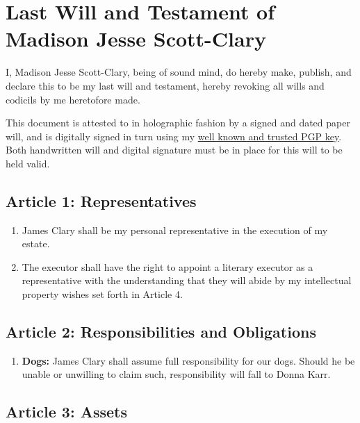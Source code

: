 \section*{Last Will and Testament of Madison Jesse Scott-Clary}\label{last-will-and-testament-of-madison-jesse-scott-clary}

I, Madison Jesse Scott-Clary, being of sound mind, do hereby make, publish, and declare this to be my last will and testament, hereby revoking all wills and codicils by me heretofore made.

This document is attested to in holographic fashion by a signed and dated paper will, and is digitally signed in turn using my \href{http://pool.sks-keyservers.net/pks/lookup?search=0x33A1685050029F7D\&op=vindex}{well known and trusted PGP key}. Both handwritten will and digital signature must be in place for this will to be held valid.

\subsection*{Article 1: Representatives}\label{article-1-representatives}

\begin{enumerate}
\def\labelenumi{\arabic{enumi}.}
\tightlist
\item
  James Clary shall be my personal representative in the execution of my estate.
\item
  The executor shall have the right to appoint a literary executor as a representative with the understanding that they will abide by my intellectual property wishes set forth in Article 4.
\end{enumerate}

\subsection*{Article 2: Responsibilities and Obligations}\label{article-2-responsibilities-and-obligations}

\begin{enumerate}
\def\labelenumi{\arabic{enumi}.}
\tightlist
\item
  \textbf{Dogs:} James Clary shall assume full responsibility for our dogs. Should he be unable or unwilling to claim such, responsibility will fall to Donna Karr.
\end{enumerate}

\subsection*{Article 3: Assets}\label{article-3-assets}

